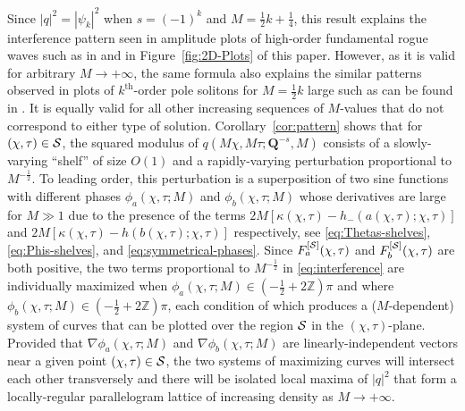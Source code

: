 Since $|q|^2=|\psi_k|^2$ when $s=(-1)^k$ and $M=\tfrac{1}{2}k+\tfrac{1}{4}$, this result explains the interference pattern seen in amplitude plots of high-order fundamental rogue waves such as in \cite[Figure 2]{BilmanLM20} and in Figure~\ref{fig:2D-Plots} of this paper.  However, as it is valid for arbitrary $M\to+\infty$, the same formula also explains the similar patterns observed in plots of $k^\mathrm{th}$-order pole solitons for $M=\tfrac{1}{2}k$ large such as can be found in \cite{BilmanB19,BilmanBW19}.  It is equally valid for all other increasing sequences of $M$-values that do not correspond to either type of solution.
Corollary~\ref{cor:pattern} shows that for $(\chi,\tau)\in\mathcal{S}$, the squared modulus of $q(M\chi, M \tau; \mathbf{Q}^{-s}, M)$ consists of a slowly-varying ``shelf'' of size $O(1)$ and a rapidly-varying perturbation proportional to $M^{-\frac{1}{2}}$. To leading order, this perturbation is a superposition of two sine functions with different phases $\phi_a(\chi,\tau;M)$ and $\phi_b(\chi,\tau;M)$ whose derivatives are large for $M\gg 1$ due to the presence of the terms $2M[\kappa(\chi,\tau)-h_-(a(\chi,\tau);\chi,\tau)]$ and $2M[\kappa(\chi,\tau)-h(b(\chi,\tau);\chi,\tau)]$ respectively, see \eqref{eq:Thetas-shelves}, \eqref{eq:Phis-shelves}, and \eqref{eq:symmetrical-phases}.  
Since $F_a^{[\mathcal{S}]}(\chi,\tau)$ and $F_b^{[\mathcal{S}]}(\chi,\tau)$ are both positive, the two terms proportional to $M^{-\frac{1}{2}}$ in \eqref{eq:interference} are individually maximized when $\phi_a(\chi,\tau;M)\in (-\tfrac{1}{2}+2\mathbb{Z})\pi$ and where $\phi_b(\chi,\tau;M)\in (-\tfrac{1}{2}+2\mathbb{Z})\pi$, each condition of which produces a ($M$-dependent) system of curves that can be plotted over the region $\mathcal{S}$ in the $(\chi,\tau)$-plane.  Provided that $\nabla\phi_a(\chi,\tau;M)$ and $\nabla\phi_b(\chi,\tau;M)$ are linearly-independent vectors near a given point $(\chi,\tau)\in\mathcal{S}$, the two systems of maximizing curves will intersect each other transversely and there will be isolated local maxima of $|q|^2$ that form a locally-regular parallelogram lattice of increasing density as $M\to+\infty$.  
